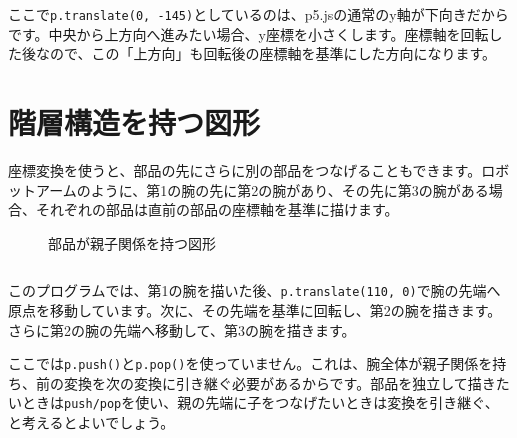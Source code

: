 ここで\texttt{p.translate(0, -145)}としているのは、p5.jsの通常のy軸が下向きだからです。中央から上方向へ進みたい場合、y座標を小さくします。座標軸を回転した後なので、この「上方向」も回転後の座標軸を基準にした方向になります。

\section{階層構造を持つ図形}

座標変換を使うと、部品の先にさらに別の部品をつなげることもできます。ロボットアームのように、第1の腕の先に第2の腕があり、その先に第3の腕がある場合、それぞれの部品は直前の部品の座標軸を基準に描けます。

\begin{figure}[htbp]
    \centering
    \caption{部品が親子関係を持つ図形}
    \label{fig:chapter09-hierarchical-parts}
\end{figure}

\begin{listing}[htbp]
\inputminted{ts}{typescript-p5/listings/chapter09/robot-arm.ts}
\caption{座標変換を重ねてロボットアームを描く（\texttt{chapter09/robot-arm.ts}）}
\label{lst:chapter09-robot-arm}
\end{listing}

このプログラムでは、第1の腕を描いた後、\texttt{p.translate(110, 0)}で腕の先端へ原点を移動しています。次に、その先端を基準に回転し、第2の腕を描きます。さらに第2の腕の先端へ移動して、第3の腕を描きます。

ここでは\texttt{p.push()}と\texttt{p.pop()}を使っていません。これは、腕全体が親子関係を持ち、前の変換を次の変換に引き継ぐ必要があるからです。部品を独立して描きたいときは\texttt{push/pop}を使い、親の先端に子をつなげたいときは変換を引き継ぐ、と考えるとよいでしょう。

